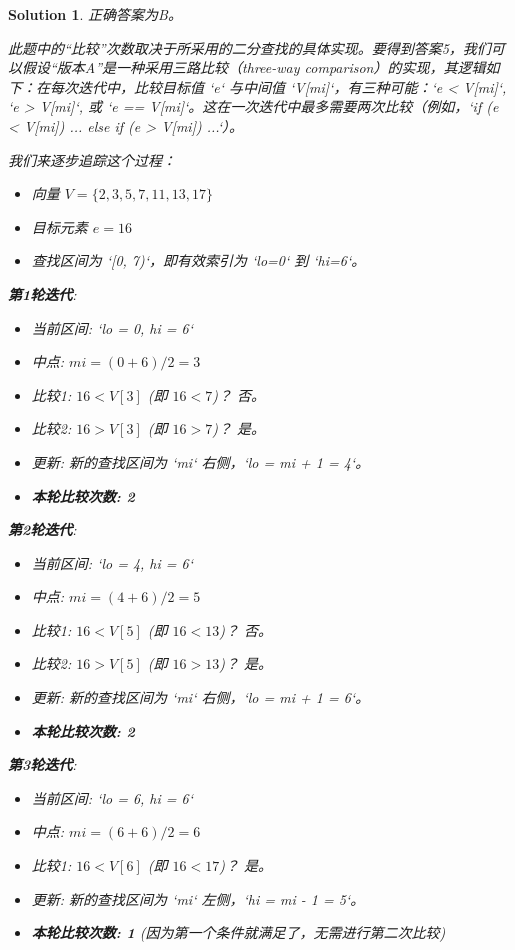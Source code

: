 \documentclass[UTF8]{report}
\newtheorem{solution}{Solution}
\theoremstyle{MyLineTheoremStyle} %
\theoremstyle{MyBlockTheoremStyle} %
\theoremstyle{MySubsubsectionStyle} %
\begin{document}
\begin{solution}
正确答案为B。

此题中的“比较”次数取决于所采用的二分查找的具体实现。要得到答案5，我们可以假设“版本A”是一种采用三路比较（three-way comparison）的实现，其逻辑如下：在每次迭代中，比较目标值 `e` 与中间值 `V[mi]`，有三种可能：`e < V[mi]`, `e > V[mi]`, 或 `e == V[mi]`。这在一次迭代中最多需要两次比较（例如，`if (e < V[mi]) ... else if (e > V[mi]) ...`）。

我们来逐步追踪这个过程：
\begin{itemize}
    \item 向量 $V = \{2, 3, 5, 7, 11, 13, 17\}$
    \item 目标元素 $e = 16$
    \item 查找区间为 `[0, 7)`，即有效索引为 `lo=0` 到 `hi=6`。
\end{itemize}

\textbf{第1轮迭代}:
\begin{itemize}
    \item 当前区间: `lo = 0, hi = 6`
    \item 中点: $mi = (0 + 6) / 2 = 3$
    \item 比较1: $16 < V[3]$ (即 $16 < 7$)？ 否。
    \item 比较2: $16 > V[3]$ (即 $16 > 7$)？ 是。
    \item 更新: 新的查找区间为 `mi` 右侧，`lo = mi + 1 = 4`。
    \item \textbf{本轮比较次数: 2}
\end{itemize}

\textbf{第2轮迭代}:
\begin{itemize}
    \item 当前区间: `lo = 4, hi = 6`
    \item 中点: $mi = (4 + 6) / 2 = 5$
    \item 比较1: $16 < V[5]$ (即 $16 < 13$)？ 否。
    \item 比较2: $16 > V[5]$ (即 $16 > 13$)？ 是。
    \item 更新: 新的查找区间为 `mi` 右侧，`lo = mi + 1 = 6`。
    \item \textbf{本轮比较次数: 2}
\end{itemize}

\textbf{第3轮迭代}:
\begin{itemize}
    \item 当前区间: `lo = 6, hi = 6`
    \item 中点: $mi = (6 + 6) / 2 = 6$
    \item 比较1: $16 < V[6]$ (即 $16 < 17$)？ 是。
    \item 更新: 新的查找区间为 `mi` 左侧，`hi = mi - 1 = 5`。
    \item \textbf{本轮比较次数: 1} (因为第一个条件就满足了，无需进行第二次比较)
\end{itemize}


\end{solution}
\end{document}
